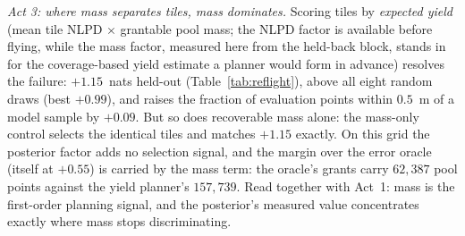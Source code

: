  \emph{Act 3: where mass separates tiles, mass dominates.} Scoring tiles by \emph{expected yield} (mean tile NLPD $\times$
grantable pool mass; the NLPD factor is available before flying, while
the mass factor, measured here from the held-back block, stands in for
the coverage-based yield estimate a planner would form in advance)
resolves the failure:
$+1.15$~nats held-out (Table~\ref{tab:reflight}), above all eight
random draws (best $+0.99$), and raises the fraction of evaluation
points within $0.5$~m of a model sample by $+0.09$. But so does recoverable mass alone: the mass-only control
selects the identical tiles and matches $+1.15$ exactly. On this grid
the posterior factor adds no selection signal, and the margin over
the error oracle (itself at $+0.55$) is carried by the mass term: the oracle's
grants carry $62{,}387$ pool points against the yield planner's
$157{,}739$. Read together with Act~1: mass is the first-order
planning signal, and the posterior's measured value concentrates
exactly where mass stops discriminating.
